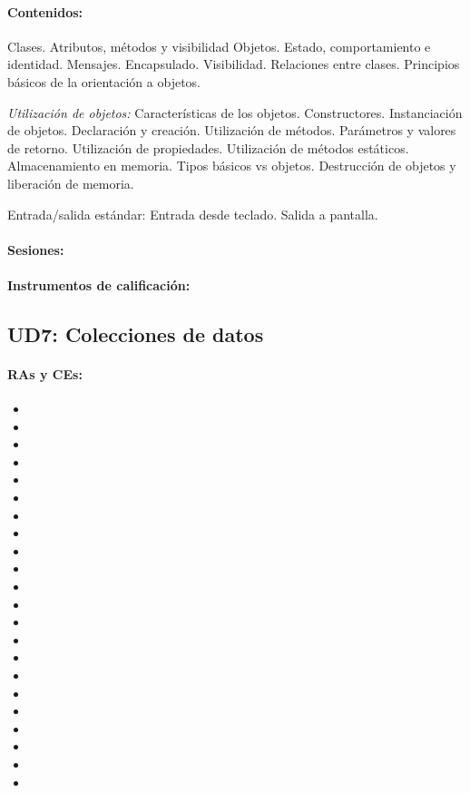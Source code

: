 	\paragraph{Contenidos:}
		Clases. Atributos, métodos y visibilidad
		Objetos. Estado, comportamiento e identidad. Mensajes.
		Encapsulado. Visibilidad.
		Relaciones entre clases.
		Principios básicos de la orientación a objetos.

		\emph{Utilización de objetos:}
		Características de los objetos.
		Constructores.
		Instanciación de objetos. Declaración y creación.
		Utilización de métodos. Parámetros y valores de retorno.
		Utilización de propiedades.
		Utilización de métodos estáticos.
		Almacenamiento en memoria. Tipos básicos vs objetos.
		Destrucción de objetos y liberación de memoria.

		Entrada/salida estándar: Entrada desde teclado. Salida a pantalla.

	\paragraph{Sesiones:}
	\paragraph{Instrumentos de calificación:}



\newpage
\subsection{UD7: Colecciones de datos}

	\paragraph{RAs y CEs:}
	\begin{itemize}[itemsep=0.1em, topsep=0.1em]
		\item\RAUNOf
		\item\RAUNOi		
		\item\RATRESe
		\item\RATRESf
		\item\RATRESg
		\item\RACINCOa
		\item\RACINCOb
		\item\RACINCOc
		\item\RADOSc
		\item\RADOSg
		\item\RADOSh
		\item\RADOSi
		\item\RASEISa
		\item\RASEISb
		\item\RASEISc
		\item\RASEISd
		\item\RASEISe
		\item\RASEISh
		\item\RASEISi
		\item\RASEISj
		\item\RACINCOd
		\item\RACINCOe
	\end{itemize}
	
